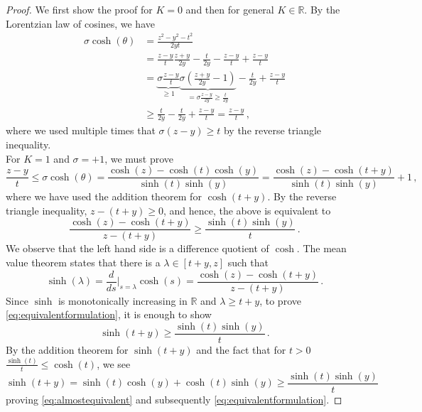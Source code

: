 \documentclass[11pt,reqno]{amsart}
\theoremstyle{definition}
\theoremstyle{definition}
\theoremstyle{plain}
\theoremstyle{remark}
\newcommand{\R}{\mathbb R}
\begin{document}
\begin{proof}
    We first show the proof for $K=0$ and then for general $K\in\R$.
    By the Lorentzian law of cosines, we have
    \begin{align*}
        \sigma \cosh(\theta)&=\frac{z^2-y^2-t^2}{2yt}\\
        &=\frac{z-y}{t} \frac{z+y}{2y}-\frac{t}{2y} - \frac{z-y}{t} + \frac{z-y}{t}\\
        &=\underbrace{\sigma\frac{z-y}{t}}_{\geq1}\underbrace{\sigma\left(\frac{z+y}{2y}-1\right)}_{=\sigma\frac{z-y}{2y}\geq\frac{t}{2y}}-\frac{t}{2y}+\frac{z-y}{t}\\
        &\geq\frac{t}{2y}-\frac{t}{2y}+\frac{z-y}{t}=\frac{z-y}{t} \, ,
    \end{align*}
    where we used multiple times that $\sigma(z-y)\geq t$ by the reverse triangle inequality. \\

    For $K=1$ and $\sigma=+1$, we must prove
    \begin{equation*}
        \frac{z-y}{t} \leq 
        \sigma \cosh(\theta) =\frac{\cosh(z) - \cosh(t)\cosh(y)}{\sinh(t) \sinh(y)} 
        =\frac{\cosh(z) - \cosh(t+y)}{\sinh(t) \sinh(y)} +1 \, , 
    \end{equation*}
    where we have used the addition theorem for $\cosh(t+y)$. By the reverse triangle inequality, $z-(t+y)\geq 0$, and hence, the above is equivalent to 
    \begin{equation}\label{eq:equivalentformulation}
    \frac{\cosh(z)-\cosh(t+y)}{z-(t+y)} \geq \frac{\sinh(t)\sinh(y)}{t} \, .
    \end{equation}
    We observe that the left hand side is a difference quotient of $\cosh$. The mean value theorem states that there is a $\lambda\in[t+y,z]$ such that 
    \[\sinh(\lambda)=\frac{d}{d s}\bigg|_{s=\lambda}\cosh(s) = \frac{\cosh(z)-\cosh(t+y)}{z-(t+y)} \, .\]
    Since $\sinh$ is monotonically increasing in $\R$ and $\lambda\geq t+y$, to prove \eqref{eq:equivalentformulation}, it is enough to show
    \begin{equation}\label{eq:almostequivalent}
    \sinh(t+y) \geq \frac{\sinh(t)\sinh(y)}{t} \, .
    \end{equation}
    By the addition theorem for $\sinh(t+y)$ and the fact that for $t>0$ $\frac{\sinh(t)}{t}\leq \cosh(t)$, we see
    \[\sinh(t+y)=\sinh(t)\cosh(y)+\cosh(t)\sinh(y)\geq\frac{\sinh(t)\sinh(y)}{t}\]
    proving \eqref{eq:almostequivalent} and subsequently \eqref{eq:equivalentformulation}. 


\end{proof}
\end{document}
